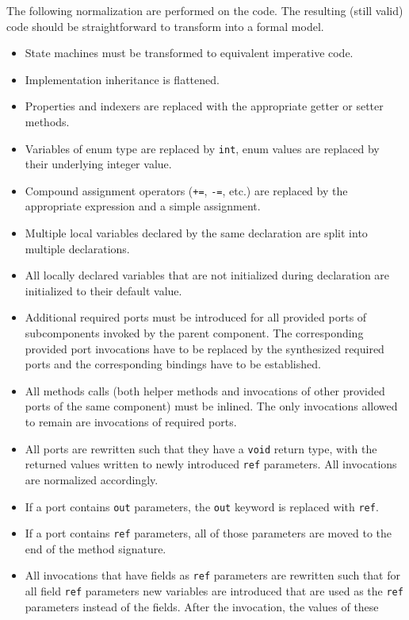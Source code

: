 \documentclass[a4paper,10pt,english]{article}
\begin{document}
The following normalization are performed on the \CSharp code. The resulting (still valid) \CSharp code should be straightforward
to transform into a formal model.
\begin{itemize}
	\item State machines must be transformed to equivalent imperative code.
	\item Implementation inheritance is flattened. 
	\item Properties and indexers are replaced with the appropriate getter or setter methods.
	\item Variables of enum type are replaced by \texttt{int}, enum values are replaced by their underlying integer value.
	\item Compound assignment operators (\texttt{+=}, \texttt{-=}, etc.) are replaced by the appropriate expression and a simple
	assignment.
	\item Multiple local variables declared by the same declaration are split into multiple declarations.
	\item All locally declared variables that are not initialized during declaration are initialized to their default value.
	\item Additional required ports must be introduced for all provided ports of subcomponents invoked by the parent component. The
	corresponding provided port invocations have to be replaced by the synthesized required ports and the corresponding bindings have
	to be established.
	\item All methods calls (both helper methods and invocations of other provided ports of the same component) must be inlined. The
	only invocations allowed to remain are invocations of required ports.
	\item All ports are rewritten such that they have a \texttt{void} return type, with the returned values written to newly
	introduced \texttt{ref} parameters. All invocations are normalized accordingly.
	\item If a port contains \texttt{out} parameters, the \texttt{out} keyword is replaced with \texttt{ref}.
	\item If a port contains \texttt{ref} parameters, all of those parameters are moved to the end of the method signature.
	\item All invocations that have fields as \texttt{ref} parameters are rewritten such that for all field \texttt{ref} parameters new variables are
	introduced that are used as the \texttt{ref} parameters instead of the fields. After the invocation, the values of these

\end{itemize}
\end{document}

